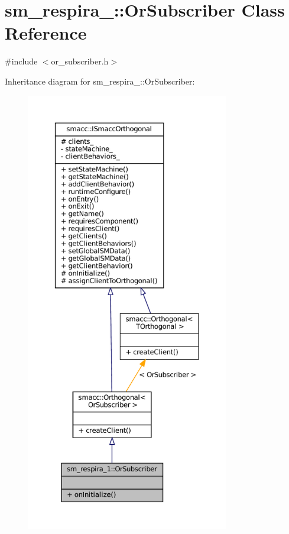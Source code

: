 \hypertarget{classsm__respira__1_1_1OrSubscriber}{}\section{sm\+\_\+respira\+\_\+:\+:Or\+Subscriber Class Reference}
\label{classsm__respira__1_1_1OrSubscriber}


{\ttfamily \#include $<$or\+\_\+subscriber.\+h$>$}



Inheritance diagram for sm\+\_\+respira\+\_\+:\+:Or\+Subscriber\+:
\nopagebreak
\begin{figure}[H]
\begin{center}
\leavevmode
\includegraphics[height=550pt]{classsm__respira__1_1_1OrSubscriber__inherit__graph}
\end{center}
\end{figure}


